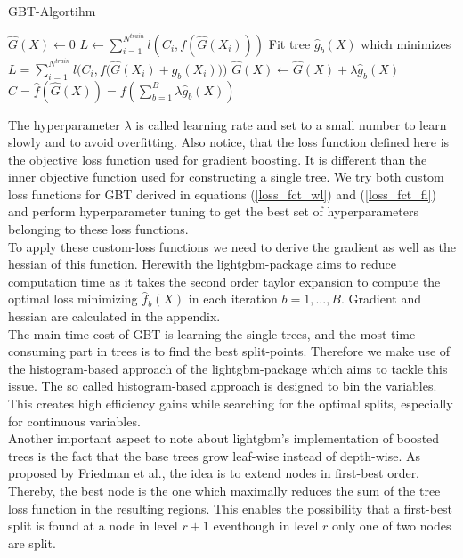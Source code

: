 \documentclass[12pt,titlepage]{article}
\begin{document}
\begin{algorithm}
\caption{GBT-Algortihm}\label{alg:boostedtrees}
\begin{algorithmic}
    \State $\hat{G}(X) \gets 0$
    \State $L \gets \sum_{i=1}^{N^{train}} l(C_{i}, f(\hat{G}(X_{i})))$
        \State Fit tree $\hat{g}_{b}(X)$ which minimizes $L = \sum_{i=1}^{N^{train}} l\Big(C_{i}, f\big(\hat{G}(X_{i}) + \hat{g}_{b}(X_{i})\big)\Big)$
        \State $\hat{G}(X) \gets \hat{G}(X) + \lambda\hat{g}_{b}(X)$
    \EndFor
    \State $\hat{C} = \hat{f}(\hat{G}(X)) = f(\sum_{b=1}^{B}\lambda\hat{g}_{b}(X))$
\end{algorithmic}
\end{algorithm}
\vspace{3mm}
\noindent
The hyperparameter $\lambda$ is called learning rate and set to a small number to learn slowly and to avoid overfitting. Also notice, that the loss function defined here is the objective loss function used for gradient boosting. It is different than the inner objective function used for constructing a single tree. We try both custom loss functions for GBT derived in equations (\ref{loss_fct_wl}) and (\ref{loss_fct_fl}) and perform hyperparameter tuning to get the best set of hyperparameters belonging to these loss functions. \\
To apply these custom-loss functions we need to derive the gradient as well as the hessian of this function. Herewith the lightgbm-package \cite{gbt} aims to reduce computation time as it takes the second order taylor expansion to compute the optimal loss minimizing $\hat{f}_{b}(X)$ in each iteration $b=1,...,B$. Gradient and hessian are calculated in the appendix. \\
The main time cost of GBT is learning the single trees, and the most time-consuming part in trees is to find the best split-points. Therefore we make use of the histogram-based approach of the lightgbm-package which aims to tackle this issue. The so called histogram-based approach is designed to bin the variables. This creates high efficiency gains while searching for the optimal splits, especially for continuous variables. \\
Another important aspect to note about lightgbm's implementation of boosted trees is the fact that the base trees grow leaf-wise instead of depth-wise. As proposed by Friedman et al., the idea is to extend nodes in first-best order. Thereby, the best node is the one which maximally reduces the sum of the tree loss function in the resulting regions. This enables the possibility that a first-best split is found at a node in level $r+1$ eventhough in level $r$ only one of two nodes are split. \\
\end{document}
